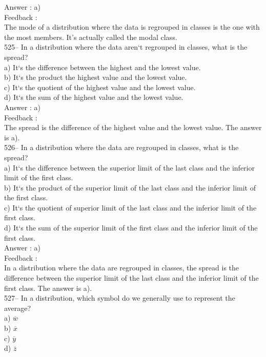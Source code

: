 ﻿\documentclass[letterpaper, 12pt]{article}
\begin{document}
Answer : a)\\

Feedback : \\
The mode of a distribution where the data is regrouped in classes is the one with the most members. It's actually called the modal class.\\

525-- In a distribution where the data aren`t regrouped in classes, what is the spread?\\
a) It`s the difference between the highest and the lowest value.\\
b) It`s the product the highest value and the lowest value.\\
c) It`s the quotient of the highest value and the lowest value.\\
d) It`s the sum of the highest value and the lowest value.\\

Answer : a)\\

Feedback : \\
The spread is the difference of the highest value and the lowest value.  The answer is a).\\

526-- In a distribution where the data are regrouped in classes, what is the spread?\\
a) It`s the difference between the superior limit of the last class and the inferior limit of the first class.\\
b) It`s the product of the superior limit of the last class and the inferior limit of the first class.\\
c) It`s the quotient of superior limit of the last class and the inferior limit of the first class.\\
d) It`s the sum of the superior limit of the first class and the inferior limit of the first class.\\

Answer : a) \\

Feedback : \\
In a distribution where the data are regrouped in classes, the spread is the difference between the superior limit of the last class and the inferior limit of the first class.
The answer is a).\\

527-- In a distribution, which symbol do we generally use to represent the average?\\
a) $\overline{w}$\\
b) $\overline{x}$\\
c) $\overline{y}$\\
d) $\overline{z}$\\
\end{document}
